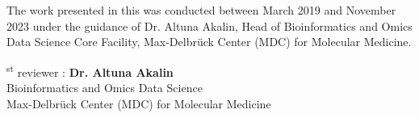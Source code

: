 
\begin{supervisorpage} 



\vspace{100pt} %
\noindent

The work presented in this was conducted between March 2019 and November 2023 under the guidance of Dr. Altuna Akalin, Head of Bioinformatics and Omics Data Science Core Facility, Max-Delbrück Center (MDC) for Molecular Medicine.\\

\vspace{10pt} %

\textsuperscript{st} reviewer : \textbf{Dr. Altuna Akalin}\\
\hspace*{5.3em} Bioinformatics and Omics Data Science\\
\hspace*{5.3em} Max-Delbrück Center (MDC) for Molecular Medicine


\end{supervisorpage}
